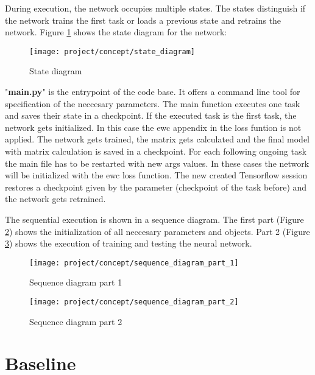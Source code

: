 During execution, the network occupies multiple states.
The states distinguish if the network trains the first task or loads a previous state and retrains the network.
Figure \ref{fig:concept_state_diagram} shows the state diagram for the network:

\begin{figure}[H]
    \centering
    \texttt{[image: project/concept/state\_diagram]}
    \caption{State diagram}
    \label{fig:concept_state_diagram}
\end{figure}

"\textbf{main.py}" is the entrypoint of the code base.
It offers a command line tool for specification of the neccesary parameters.
\newline
The main function executes one task and saves their state in a checkpoint.
If the executed task is the first task, the network gets initialized.
In this case the \acrshort{ewc} appendix in the loss funtion is not applied.
The network gets trained, the matrix gets calculated and the final model with matrix calculation is saved in a checkpoint.
For each following ongoing task the main file has to be restarted with new args values.
In these cases the network will be initialized with the \acrshort{ewc} loss function.
The new created Tensorflow session restores a checkpoint given by the parameter (checkpoint of the task before) and the network gets retrained.

The sequential execution is shown in a sequence diagram.
The first part (Figure \ref{fig:concept_sequence_diagram_part_1}) shows the initialization of all neccesary parameters and objects.
Part 2 (Figure \ref{fig:concept_sequence_diagram_part_2}) shows the execution of training and testing the neural network.

\begin{figure}[H]
    \centering
    \texttt{[image: project/concept/sequence\_diagram\_part\_1]}
    \caption{Sequence diagram part 1}
    \label{fig:concept_sequence_diagram_part_1}
\end{figure}

\begin{figure}[H]
    \centering
    \texttt{[image: project/concept/sequence\_diagram\_part\_2]}
    \caption{Sequence diagram part 2}
    \label{fig:concept_sequence_diagram_part_2}
\end{figure}

\newpage
\section{Baseline}

